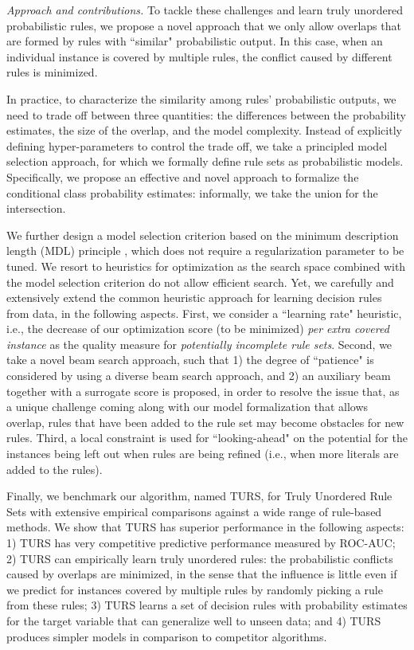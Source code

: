 \emph{Approach and contributions.}
To tackle these challenges and learn truly unordered probabilistic rules, we propose a novel approach that we only allow overlaps that are formed by rules with ``similar" probabilistic output. In this case, when an individual instance is covered by multiple rules, the conflict caused by different rules is minimized. 

In practice, to characterize the similarity among rules' probabilistic outputs, we need to trade off between three quantities: the differences between the probability estimates, the size of the overlap, and the model complexity. Instead of explicitly defining hyper-parameters to control the trade off, we take a principled model selection approach, for which we formally define rule sets as probabilistic models. Specifically, we propose an effective and novel approach to formalize the conditional class probability estimates: informally, we take the union for the intersection. 

We further design a model selection criterion based on the minimum description length (MDL) principle \citep{grunwald2019minimum}, which does not require a regularization parameter to be tuned. 
We resort to heuristics for optimization as the search space combined with the model selection criterion do not allow efficient search. Yet, we carefully and extensively extend the common heuristic approach for learning decision rules from data, in the following aspects. First, we consider a ``learning rate" heuristic, i.e., the decrease of our optimization score (to be minimized) \emph{per extra covered instance} as the quality measure for \emph{potentially incomplete rule sets}. Second, we take a novel beam search approach, such that 1) the degree of ``patience" is considered by using a diverse beam search approach, and 2) an auxiliary beam together with a surrogate score is proposed, in order to resolve the issue that, as a unique challenge coming along with our model formalization that allows overlap, rules that have been added to the rule set may become obstacles for new rules. 
Third, a local constraint is used for ``looking-ahead" on the potential for the instances being left out when rules are being refined (i.e., when more literals are added to the rules). 

Finally, we benchmark our algorithm, named TURS, for Truly Unordered Rule Sets with extensive empirical comparisons against a wide range of rule-based methods. We show that TURS has superior performance in the following aspects: 1) TURS has very competitive predictive performance measured by ROC-AUC; 2) TURS can empirically learn truly unordered rules: the probabilistic conflicts caused by overlaps are minimized, in the sense that the influence is little even if we predict for instances covered by multiple rules by randomly picking a rule from these rules; 3) TURS learns a set of decision rules with probability estimates for the target variable that can generalize well to unseen data; and 4) TURS produces simpler models in comparison to competitor algorithms. 

